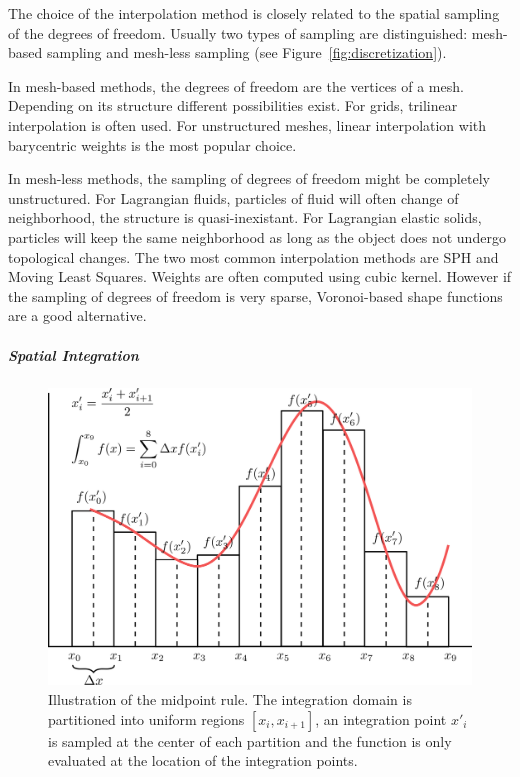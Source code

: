The choice of the interpolation method is closely related to the spatial sampling of the degrees of freedom. Usually two types of sampling are distinguished: mesh-based sampling and mesh-less sampling (see Figure~\ref{fig:discretization}).

In mesh-based methods, the degrees of freedom are the vertices of a mesh. Depending on its structure different possibilities exist. For grids, trilinear interpolation is often used. For unstructured meshes, linear interpolation with barycentric weights is the most popular choice.

In mesh-less methods, the sampling of degrees of freedom might be completely unstructured. For Lagrangian fluids, particles of fluid will often change of neighborhood, the structure is quasi-inexistant. For Lagrangian elastic solids, particles will keep the same neighborhood as long as the object does not undergo topological changes. The two most common interpolation methods are SPH and Moving Least Squares. Weights are often computed using cubic kernel. However if the sampling of degrees of freedom is very sparse, Voronoi-based shape functions are a good alternative.

\subparagraph{Spatial Integration}

\begin{figure}[!ht]
\centering
\includegraphics[scale=1.0]{images/continuum_mechanics/spatialIntegration.png}
\caption[STAR mechanics: Spatial integration]{\label{fig:spatialIntegration} Illustration of the midpoint rule. The integration domain is partitioned into uniform regions $\left[x_{i}, x_{i+1}\right]$, an integration point $x'_{i}$ is sampled at the center of each partition and the function is only evaluated at the location of the integration points.}
\end{figure}

